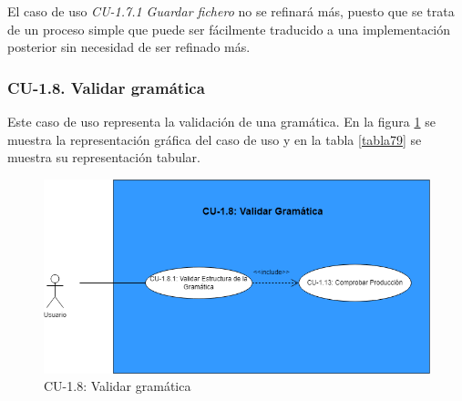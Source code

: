  El caso de uso \textit{CU-1.7.1 Guardar fichero} no se refinará más, puesto que se trata de un proceso simple que puede ser fácilmente traducido a una implementación posterior sin necesidad de ser refinado más.

 \subsubsection{CU-1.8. Validar gramática}

 Este caso de uso representa la validación de una gramática. En la figura \ref{fig:CU18} se muestra la representación gráfica del caso de uso y en la tabla \ref{tabla79} se muestra su representación tabular.

 \begin{figure}[H]
       \begin{center} 
 	\includegraphics[scale=0.55]{figuras/Cap7/CU18.png}
 	\caption{CU-1.8: Validar gramática}
 	\label{fig:CU18}
       \end{center}
   \end{figure}
  
   \newpage

